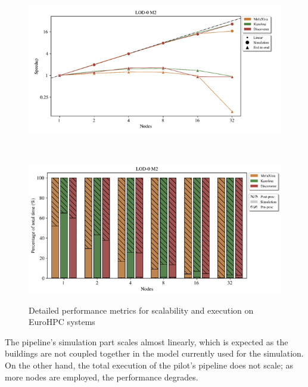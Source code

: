 \documentclass[runningheads]{llncs}
\begin{document}
\begin{figure}  %
  \centering
  \begin{subfloat}{
    \includegraphics[width=0.9\linewidth]{img-compressed-kub-scalability.png}
    \label{fig:scalability}
  }\end{subfloat}
  \\
  \begin{subfloat}{
    \includegraphics[width=0.9\linewidth]{img-compressed-kub-bencharkings-execution.png}
    \label{fig:execution-breakdown}
  }\end{subfloat}
  \caption{Detailed performance metrics for scalability and execution on EuroHPC systems}
  \label{fig:combined-metrics}
\end{figure}
The pipeline's simulation part scales almost linearly, which is expected as the buildings are not coupled together in the model currently used for the simulation. On the other hand, the total execution of the pilot's pipeline does not scale; as more nodes are employed, the performance degrades.
\end{document}
